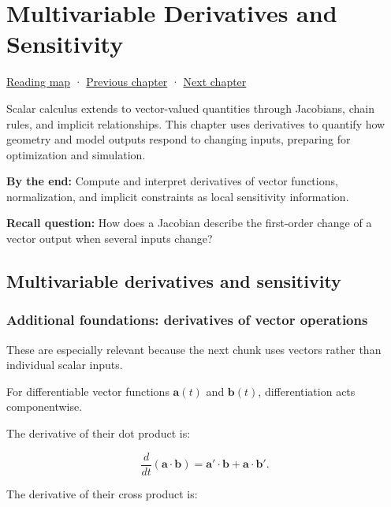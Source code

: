 \hypertarget{02-foundations-ii-ch021}{}
\chapter{Multivariable Derivatives and Sensitivity}\label{stagechapter:02-foundations-ii-ch021}\label{02-foundations-ii-ch021-multivariable-derivatives-and-sensitivity}

\hyperref[volume-reading-map]{Reading map} · \hyperref[01-foundations-i-ch020-choose-matrix-factorizations-from-structure]{Previous chapter} · \hyperref[02-foundations-ii-ch022-accumulation-quadrature-and-the-bridge-to-probability]{Next chapter}

Scalar calculus extends to vector-valued quantities through Jacobians, chain rules, and implicit relationships. This chapter uses derivatives to quantify how geometry and model outputs respond to changing inputs, preparing for optimization and simulation.

\textbf{By the end:} Compute and interpret derivatives of vector functions, normalization, and implicit constraints as local sensitivity information.

\textbf{Recall question:} How does a Jacobian describe the first-order change of a vector output when several inputs change?

\section{Multivariable derivatives and sensitivity}\label{02-foundations-ii-ch021-multivariable-derivatives-and-sensitivity-1}

\subsection{Additional foundations: derivatives of vector operations}\label{02-foundations-ii-ch021-additional-foundations-derivatives-of-vector-operations}

These are especially relevant because the next chunk uses vectors rather than individual scalar inputs.

For differentiable vector functions \(\mathbf a(t)\) and \(\mathbf b(t)\), differentiation acts componentwise.

The derivative of their dot product is:

\[
\frac d{dt}(\mathbf a\cdot\mathbf b) =\mathbf a'\cdot\mathbf b+\mathbf a\cdot\mathbf b'.
\]

The derivative of their cross product is:

